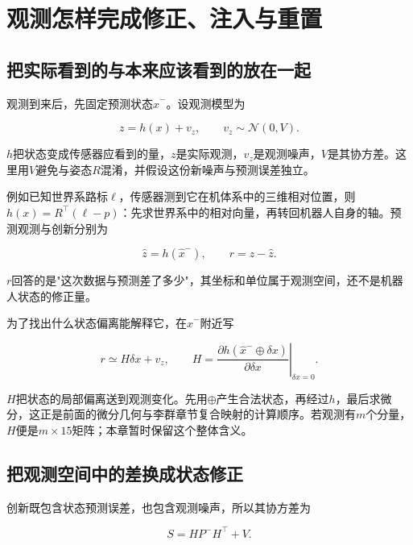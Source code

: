 \section{观测怎样完成修正、注入与重置}

\subsection{把实际看到的与本来应该看到的放在一起}

观测到来后，先固定预测状态$\hat x^-$。设观测模型为

\begin{equation*}
z=h(x)+v_z,\qquad v_z\sim\mathcal N(0,V).
\end{equation*}

$h$把状态变成传感器应看到的量，$z$是实际观测，$v_z$是观测噪声，$V$是其协方差。这里用$V$避免与姿态$R$混淆，并假设这份新噪声与预测误差独立。

例如已知世界系路标$\ell$，传感器测到它在机体系中的三维相对位置，则$h(x)=R^\top(\ell-p)$：先求世界系中的相对向量，再转回机器人自身的轴。预测观测与创新分别为

\begin{equation*}
\hat z=h(\hat x^-),\qquad r=z-\hat z.
\end{equation*}

$r$回答的是"这次数据与预测差了多少"，其坐标和单位属于观测空间，还不是机器人状态的修正量。

为了找出什么状态偏离能解释它，在$\hat x^-$附近写

\begin{equation}\label{eq-intuition-observation}
\boxed{r\simeq H\delta x+v_z,\qquad
 H=\left.\frac{\partial h(\hat x^-\oplus\delta x)}{\partial\delta x}
 \right|_{\delta x=0}.}
\end{equation}

$H$把状态的局部偏离送到观测变化。先用$\oplus$产生合法状态，再经过$h$，最后求微分，这正是前面的微分几何与李群章节复合映射的计算顺序。若观测有$m$个分量，$H$便是$m\times15$矩阵；本章暂时保留这个整体含义。

\subsection{把观测空间中的差换成状态修正}

创新既包含状态预测误差，也包含观测噪声，所以其协方差为

\begin{equation*}
S=HP^-H^\top+V.
\end{equation*}

